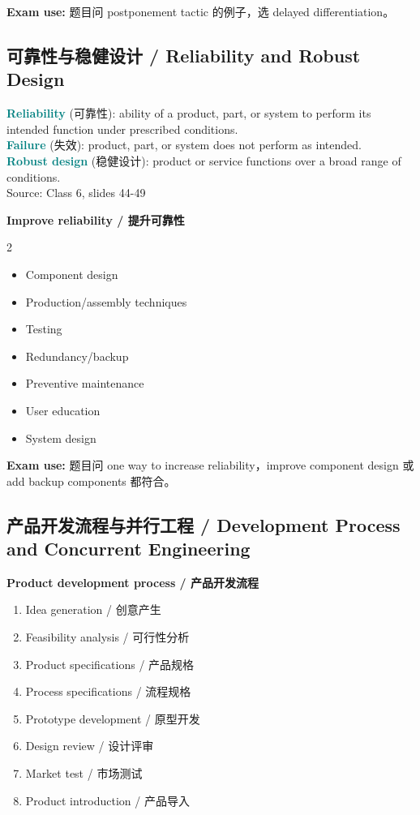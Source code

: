 \documentclass[10pt,a4paper]{ctexart}
\newcommand{\term}[2]{\textbf{\textcolor{Teal}{#1}} \textcolor{Muted}{(#2)}}
\newcommand{\source}[1]{\textcolor{Muted}{\footnotesize Source: #1}}
\newcommand{\exam}[1]{\textcolor{Amber}{\textbf{Exam use:} #1}}
\begin{document}
\exam{题目问 postponement tactic 的例子，选 delayed differentiation。}

\subsection{可靠性与稳健设计 / Reliability and Robust Design}
\label{subsec:reliability}

\term{Reliability}{可靠性}: ability of a product, part, or system to perform its intended function under prescribed conditions.\\
\term{Failure}{失效}: product, part, or system does not perform as intended.\\
\term{Robust design}{稳健设计}: product or service functions over a broad range of conditions.\\
\source{Class 6, slides 44-49}

\textbf{Improve reliability / 提升可靠性}
\begin{multicols}{2}
\begin{itemize}
  \item Component design
  \item Production/assembly techniques
  \item Testing
  \item Redundancy/backup
  \item Preventive maintenance
  \item User education
  \item System design
\end{itemize}
\end{multicols}

\exam{题目问 one way to increase reliability，improve component design 或 add backup components 都符合。}

\subsection{产品开发流程与并行工程 / Development Process and Concurrent Engineering}

\textbf{Product development process / 产品开发流程}
\begin{enumerate}
  \item Idea generation / 创意产生
  \item Feasibility analysis / 可行性分析
  \item Product specifications / 产品规格
  \item Process specifications / 流程规格
  \item Prototype development / 原型开发
  \item Design review / 设计评审
  \item Market test / 市场测试
  \item Product introduction / 产品导入
\end{enumerate}
\end{document}
